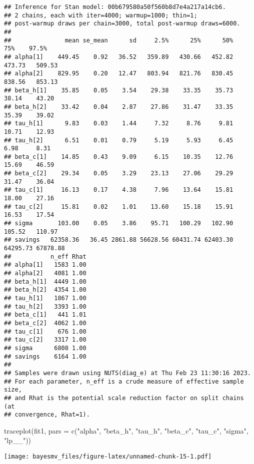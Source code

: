 \documentclass[
]{article}
\newenvironment{Shaded}{\begin{snugshade}}{\end{snugshade}}
\newcommand{\AttributeTok}[1]{\textcolor[rgb]{0.77,0.63,0.00}{#1}}
\newcommand{\FunctionTok}[1]{\textcolor[rgb]{0.00,0.00,0.00}{#1}}
\newcommand{\NormalTok}[1]{#1}
\newcommand{\StringTok}[1]{\textcolor[rgb]{0.31,0.60,0.02}{#1}}
\begin{document}
\begin{verbatim}
## Inference for Stan model: 00b679580a50f560b8d7e4a217a14cb6.
## 2 chains, each with iter=4000; warmup=1000; thin=1; 
## post-warmup draws per chain=3000, total post-warmup draws=6000.
## 
##               mean se_mean      sd     2.5%      25%      50%      75%    97.5%
## alpha[1]    449.45    0.92   36.52   359.89   430.66   452.82   473.73   509.53
## alpha[2]    829.95    0.20   12.47   803.94   821.76   830.45   838.56   853.13
## beta_h[1]    35.85    0.05    3.54    29.38    33.35    35.73    38.14    43.20
## beta_h[2]    33.42    0.04    2.87    27.86    31.47    33.35    35.39    39.02
## tau_h[1]      9.83    0.03    1.44     7.32     8.76     9.81    10.71    12.93
## tau_h[2]      6.51    0.01    0.79     5.19     5.93     6.45     6.98     8.31
## beta_c[1]    14.85    0.43    9.09     6.15    10.35    12.76    15.69    46.59
## beta_c[2]    29.34    0.05    3.29    23.13    27.06    29.29    31.47    36.04
## tau_c[1]     16.13    0.17    4.38     7.96    13.64    15.81    18.00    27.16
## tau_c[2]     15.81    0.02    1.01    13.60    15.18    15.91    16.53    17.54
## sigma       103.00    0.05    3.86    95.71   100.29   102.90   105.52   110.97
## savings   62358.36   36.45 2861.88 56628.56 60431.74 62403.30 64295.73 67878.88
##           n_eff Rhat
## alpha[1]   1583 1.00
## alpha[2]   4081 1.00
## beta_h[1]  4449 1.00
## beta_h[2]  4354 1.00
## tau_h[1]   1867 1.00
## tau_h[2]   3393 1.00
## beta_c[1]   441 1.01
## beta_c[2]  4062 1.00
## tau_c[1]    676 1.00
## tau_c[2]   3317 1.00
## sigma      6808 1.00
## savings    6164 1.00
## 
## Samples were drawn using NUTS(diag_e) at Thu Feb 23 11:30:16 2023.
## For each parameter, n_eff is a crude measure of effective sample size,
## and Rhat is the potential scale reduction factor on split chains (at 
## convergence, Rhat=1).
\end{verbatim}

\begin{Shaded}
\begin{Highlighting}[]
\FunctionTok{traceplot}\NormalTok{(fit1, }\AttributeTok{pars =} \FunctionTok{c}\NormalTok{(}\StringTok{"alpha"}\NormalTok{, }\StringTok{"beta\_h"}\NormalTok{, }\StringTok{"tau\_h"}\NormalTok{, }\StringTok{"beta\_c"}\NormalTok{, }\StringTok{"tau\_c"}\NormalTok{, }\StringTok{"sigma"}\NormalTok{, }\StringTok{"lp\_\_"}\NormalTok{))}
\end{Highlighting}
\end{Shaded}

\texttt{[image: bayesmv\_files/figure-latex/unnamed-chunk-15-1.pdf]}
\end{document}
